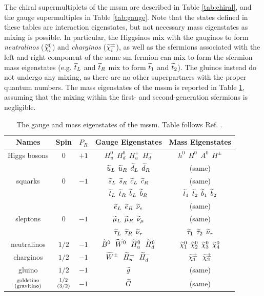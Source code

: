 The chiral supermultiplets of the \gls{mssm} are described in Table \ref{tab:chiral}, and the gauge supermultiples in Table \ref{tab:gauge}. Note that the states defined in these tables are interaction eigenstates, but not necessary mass eigenstates as mixing is possible. In particular, the Higgsinos mix with the gauginos to form \textit{neutralinos} ($\widetilde{\chi}^0_i$) and \textit{charginos} ($\widetilde{\chi}^\pm_i$), as well as the sfermions associated with the left and right component of the same \gls{sm} fermion can mix to form the sfermion mass eigenstates (e.g. $\widetilde{t}_L$ and $\widetilde{t}_R$ mix to form $\widetilde{t}_1$ and $\widetilde{t}_2$). The gluinos instead do not undergo any mixing, as there are no other superpartners with the proper quantum numbers. The mass eigenstates of the \gls{mssm} is reported in Table \ref{tab:undiscovered}, assuming that the mixing within the first- and second-generation sfermions is negligible.


\begin{table}[tb]
\begin{center}
\begin{tabular}{c c c c c }
\hline
Names & Spin & $P_R$ & Gauge Eigenstates & Mass Eigenstates \\
\hline\hline
Higgs bosons & 0 & $+1$ & 
$H_u^0\>\> H_d^0\>\> H_u^+ \>\> H_d^-$ 
& 
$h^0\>\> H^0\>\> A^0 \>\> H^\pm$
\\ \hline
& & &${\widetilde u}_L\>\> {\widetilde u}_R\>\> \widetilde d_L\>\> \widetilde d_R$&(same)
\\
squarks& 0&$-1$& ${\widetilde s}_L\>\> {\widetilde s}_R\>\> \widetilde c_L\>\>
\widetilde c_R$& (same) \\
& & &
$\widetilde t_L \>\>\widetilde t_R \>\>\widetilde b_L\>\> \widetilde b_R$ 
&
${\widetilde t}_1\>\> {\widetilde t}_2\>\> \widetilde b_1\>\> \widetilde b_2$
\\ \hline
& & &${\widetilde e}_L\>\> {\widetilde e}_R \>\>\widetilde \nu_e$&(same) 
\\
sleptons& 0&$-1$&${\widetilde \mu}_L\>\>{\widetilde \mu}_R\>\>\widetilde\nu_\mu$&(same)
\\
& & &
$\widetilde \tau_L\>\> \widetilde \tau_R \>\>\widetilde \nu_\tau$ 
&
${\widetilde \tau}_1 \>\>{\widetilde \tau}_2 \>\>\widetilde \nu_\tau$
\\
\hline
neutralinos & $1/2$&$-1$ & 
$\widetilde B^0 \>\>\>\widetilde W^0\>\>\> \widetilde H_u^0\>\>\> \widetilde H_d^0$   
&
$\widetilde \chi^0_1\>\> \widetilde \chi^0_2 \>\>\widetilde \chi^0_3\>\> \widetilde \chi^0_4$ 
\\
\hline
charginos & $1/2$&$-1$ & 
$\widetilde W^\pm\>\>\> \widetilde H_u^+ \>\>\>\widetilde H_d^-$ 
&
$\widetilde \chi_1^\pm\>\>\>\widetilde \chi_2^\pm $ 
\\
\hline
gluino & $1/2$&$-1$ &$\widetilde g$  &(same) \\
\hline
${\rm goldstino}\atop{\rm (gravitino)}$ & ${1/2}\atop{(3/2)}$&$-1$&$\widetilde 
G$  &(same) \\
\hline
\end{tabular}
\caption{The gauge and mass eigenstates of the \gls{mssm}. Table follows Ref. \cite{Martin:1997ns}. 
\label{tab:undiscovered}}
\vspace{-0.4cm}
\end{center}
\end{table}%


